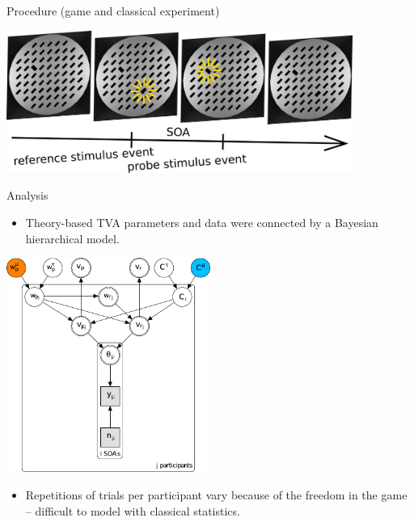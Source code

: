 \documentclass[a0paper,portrait]{baposter}
\begin{document}
\begin{poster}
		\begin{posterbox}[name=procedure,span=2,column=0,row=2, below=game]{Procedure (game and classical experiment)}
			\begin{center}
				\includegraphics[width=0.85\textwidth]{procedurev2.pdf}
			\end{center}
		\end{posterbox}
		
		\begin{posterbox}[name=results,span=1,column=2,row=0]{Analysis}
			\begin{itemize}
				\item Theory-based TVA parameters and data were connected by a Bayesian hierarchical model.
			\end{itemize}
			\begin{center}
				\includegraphics[width=0.5\textwidth]{graphmod.pdf}
			\end{center}
			\begin{itemize}
				\item Repetitions of trials per participant vary because of the freedom in the game -- difficult to model with classical statistics.
			\end{itemize}
			

\end{posterbox}
\end{poster}
\end{document}
